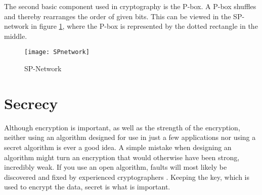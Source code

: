 The second basic component used in cryptography is the P-box. A P-box 
shuffles and thereby rearranges the order of given bits. This can be 
viewed in the SP-network in figure \ref{img:SPNetwork}, where the P-box 
is represented by the dotted rectangle in the middle.

\begin{figure}[h!]
  \begin{center}
    \texttt{[image: SPnetwork]}
    \caption{SP-Network}
    \label{img:SPNetwork}
  \end{center}
\end{figure}


\section{Secrecy}
Although encryption is important, as well as the strength of the 
encryption, neither using an algorithm designed for use in just a few 
applications nor using a secret algorithm is ever a good idea. A simple 
mistake when designing an algorithm might turn an encryption that would 
otherwise have been strong, incredibly weak. If you use an open 
algorithm, faults will most likely be discovered and fixed by 
experienced cryptographers \citep[pp. 23]{Schneier:2003}. Keeping the 
key, which is used to encrypt the data, secret is what is important.
